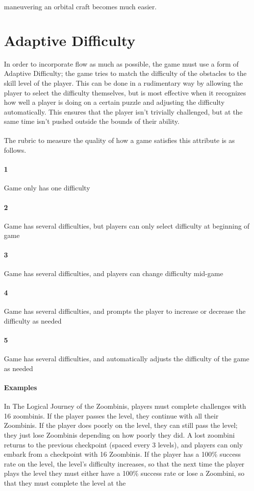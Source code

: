 maneuvering an orbital craft becomes much easier.\section{Adaptive Difficulty}{In order to incorporate flow as much as possible, the game must use a form of Adaptive Difficulty; the game tries to match the difficulty of the obstacles to the skill level of the player. This can be done in a rudimentary way by allowing the player to select the difficulty themselves, but is most effective when it recognizes how well a player is doing on a certain puzzle and adjusting the difficulty automatically. This ensures that the player isn't trivially challenged, but at the same time isn't pushed outside the bounds of their ability.}\paragraph{}The rubric to measure the quality of how a game satisfies this attribute is as follows.\paragraph{1}{Game only has one difficulty}\paragraph{2}{Game has several difficulties, but players can only select difficulty at beginning of game}\paragraph{3}{Game has several difficulties, and players can change difficulty mid-game}\paragraph{4}{Game has several difficulties, and prompts the player to increase or decrease the difficulty as needed}\paragraph{5}{Game has several difficulties, and automatically adjusts the difficulty of the game as needed}\paragraph{Examples}In The Logical Journey of the Zoombinis, players must complete challenges with 16 zoombinis. If the player passes the level, they continue with all their Zoombinis. If the player does poorly on the level, they can still pass the level; they just lose Zoombinis depending on how poorly they did. A lost zoombini returns to the previous checkpoint (spaced every 3 levels), and players can only embark from a checkpoint with 16 Zoombinis. If the player has a 100\% success rate on the level, the level's difficulty increases, so that the next time the player plays the level they must either have a 100\% success rate or lose a Zoombini, so that they must complete the level at the 